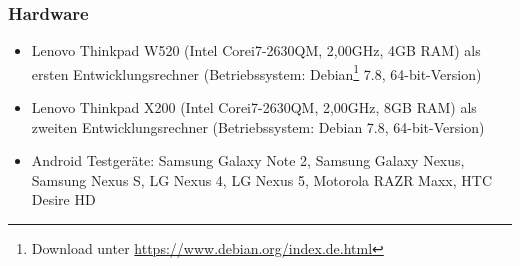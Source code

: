 \subsubsection{Hardware}
\begin{itemize}
	\item Lenovo Thinkpad W520 (Intel\textsuperscript{\textregistered} Core\texttrademark   i7-2630QM, 2,00GHz, 4GB RAM) als ersten Entwicklungsrechner (Betriebssystem: Debian\footnote{ Download unter \url{https://www.debian.org/index.de.html}} 7.8, 64-bit-Version)
	\item Lenovo Thinkpad X200 (Intel\textsuperscript{\textregistered} Core\texttrademark   i7-2630QM, 2,00GHz, 8GB RAM) als zweiten Entwicklungsrechner (Betriebssystem: Debian 7.8, 64-bit-Version)
	\item Android Testgeräte: Samsung Galaxy Note 2, Samsung Galaxy Nexus, Samsung Nexus S, LG Nexus 4, LG Nexus 5, Motorola RAZR Maxx, HTC Desire HD
\end{itemize}
